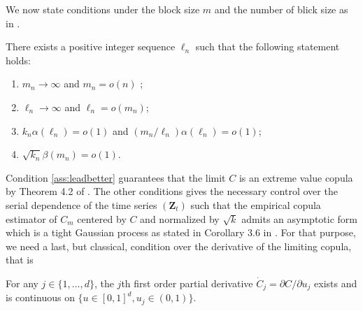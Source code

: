 \documentclass[11pt]{article}
\theoremstyle{definition}
\newenvironment{Assumption}[1]
  {\renewcommand\theinnerassumption{#1}\innerassumption}
  {\endinnerassumption}
\begin{document}
	We now state conditions under the block size $m$ and the number of blick size as in \cite{bucher2014extreme}.
	
	\begin{Assumption}{C}
	\label{ass:regularity}
	There exists a positive integer sequence $\ell_n$ such that the following statement holds:
	\begin{enumerate}
	\item $m_n \rightarrow \infty$ and $m_n = o (n)$ ;
	\item $\ell_n \rightarrow \infty$ and $\ell_n = o(m_n)$;
	\item $k_n \alpha(\ell_n) = o(1)$ and $(m_n / \ell_n) \alpha(\ell_n) = o(1)$; \label{ass:leadbetter}
	\item $\sqrt{k_n} \beta(m_n) = o(1)$.
	\end{enumerate}
	\end{Assumption}
	
	Condition \ref{ass:leadbetter} guarantees that the limit $C$ is an extreme value copula by Theorem 4.2 of \cite{hsing1989extreme}. The other conditions gives the necessary control over the serial dependence of the time series $(\textbf{Z}_t)$ such that the empirical copula estimator of $C_m$ centered by $C$ and normalized by $\sqrt{k}$ admits an asymptotic form  which is a tight Gaussian process as stated in Corollary 3.6 in \cite{bucher2014extreme}. For that purpose, we need a last, but classical, condition over the derivative of the limiting copula, that is
	
	\begin{Assumption}{D}
	\label{ass:smooth}
	For any $j \in \{1,\dots,d\}$, the $j$th first order partial derivative $\dot{C}_j = \partial C / \partial u_j$ exists and is continuous on $\{ u \in [0,1]^d, u_j \in (0,1)\}$.
	\end{Assumption}
	
\end{document}
